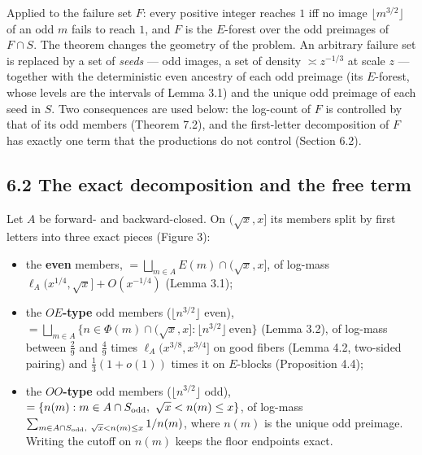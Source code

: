 \documentclass[11pt,a4paper]{article}
\providecommand{\tightlist}{\setlength{\itemsep}{0pt}\setlength{\parskip}{0pt}}
\begin{document}
Applied to the failure set \(F\): every positive integer reaches \(1\)
iff no image \(\lfloor m^{3/2}\rfloor\) of an odd \(m\) fails to reach
\(1\), and \(F\) is the \(E\)-forest over the odd preimages of
\(F\cap S\). The theorem changes the geometry of the problem. An
arbitrary failure set is replaced by a set of \emph{seeds} --- odd
images, a set of density \(\asymp z^{-1/3}\) at scale \(z\) --- together
with the deterministic even ancestry of each odd preimage (its
\(E\)-forest, whose levels are the intervals of Lemma 3.1) and the
unique odd preimage of each seed in \(S\). Two consequences are used
below: the log-count of \(F\) is controlled by that of its odd members
(Theorem 7.2), and the first-letter decomposition of \(F\) has exactly
one term that the productions do not control (Section 6.2).

\subsection{6.2 The exact decomposition and the free
term}\label{the-exact-decomposition-and-the-free-term}

Let \(A\) be forward- and backward-closed. On \((\sqrt x,x]\) its
members split by first letters into three exact pieces (Figure 3):

\begin{itemize}
\tightlist
\item
  the \textbf{even} members, \(=\bigsqcup_{m\in A}E(m)\cap(\sqrt x,x]\),
  of log-mass \(\ell_A(x^{1/4},\sqrt x]+O(x^{-1/4})\) (Lemma 3.1);
\item
  the \textbf{\(OE\)-type} odd members (\(\lfloor n^{3/2}\rfloor\)
  even),
  \(=\bigsqcup_{m\in A}\{n\in\Phi(m)\cap(\sqrt x,x]:\lfloor n^{3/2}\rfloor\ \text{even}\}\)
  (Lemma 3.2), of log-mass between \(\tfrac29\) and \(\tfrac49\) times
  \(\ell_A(x^{3/8},x^{3/4}]\) on good fibers (Lemma 4.2, two-sided
  pairing) and \(\tfrac13(1+o(1))\) times it on \(E\)-blocks
  (Proposition 4.4);
\item
  the \textbf{\(OO\)-type} odd members (\(\lfloor n^{3/2}\rfloor\) odd),
  \(=\{n(m):m\in A\cap S_{\rm odd},\ \sqrt x<n(m)\le x\}\), of log-mass
  \(\sum_{m\in A\cap S_{\rm odd},\ \sqrt x<n(m)\le x}1/n(m)\), where
  \(n(m)\) is the unique odd preimage. Writing the cutoff on \(n(m)\)
  keeps the floor endpoints exact.
\end{itemize}
\end{document}
